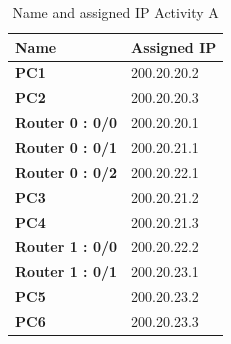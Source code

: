 \documentclass[a4paper,11pt]{article}
\begin{document}
\begin{enumerate}
          \begin{table}[H]
              \centering

              \begin{tabular}{| m{15em}| m{12em}|}
                  \hline
                  \rowcolor[rgb]{0.369,0.647,0.847} \textbf{Name} & \textbf{Assigned IP} \\
                  \hline
                  \textbf{PC1}                                    & 200.20.20.2          \\
                  \hline
                  \textbf{PC2}                                    & 200.20.20.3          \\
                  \hline
                  \textbf{Router 0 : 0/0}                         & 200.20.20.1          \\
                  \hline
                  \textbf{Router 0 : 0/1}                         & 200.20.21.1          \\
                  \hline
                  \textbf{Router 0 : 0/2}                         & 200.20.22.1          \\
                  \hline
                  \textbf{PC3}                                    & 200.20.21.2          \\
                  \hline
                  \textbf{PC4}                                    & 200.20.21.3          \\
                  \hline
                  \textbf{Router 1 : 0/0}                         & 200.20.22.2          \\
                  \hline
                  \textbf{Router 1 : 0/1}                         & 200.20.23.1          \\
                  \hline
                  \textbf{PC5}                                    & 200.20.23.2          \\
                  \hline
                  \textbf{PC6}                                    & 200.20.23.3          \\
                  \hline
              \end{tabular}
              \caption{Name and assigned IP Activity A}
          \end{table}



\end{enumerate}
\end{document}

